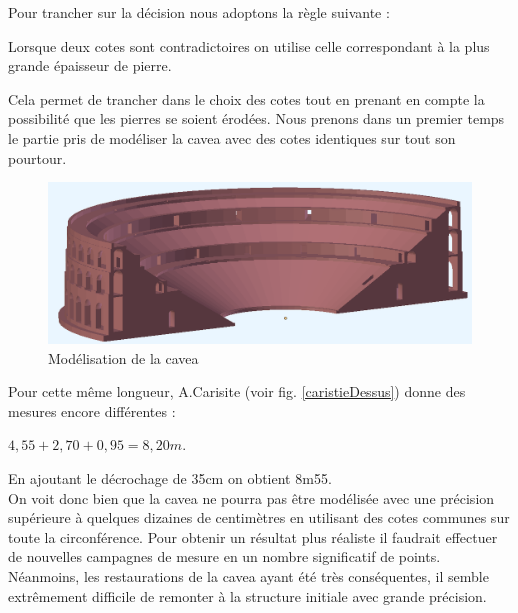 Pour trancher sur la décision nous adoptons la règle suivante :

\begin{theo}\label{epaisseur}
	Lorsque deux cotes sont contradictoires on utilise celle correspondant à la plus grande épaisseur de pierre.
\end{theo}

Cela permet de trancher dans le choix des cotes tout en prenant en compte la possibilité que les pierres se soient érodées. Nous prenons dans un premier temps le partie pris de modéliser la cavea avec des cotes identiques sur tout son pourtour. 

\begin{figure}[!h]
	\includegraphics[width=\linewidth]{images/modCavea}
	\caption{Modélisation de la \gls{cavea}} 
	\label{modCavea} 
\end{figure} 


Pour cette même longueur, A.Carisite (voir fig. \ref{caristieDessus}) donne des mesures encore différentes : 
\begin{center}
$4,55+2,70+0,95=8,20m$.
\end{center}
En ajoutant le décrochage de 35cm on obtient 8m55. \\

On voit donc bien que la cavea ne pourra pas être modélisée avec une précision supérieure à quelques dizaines de centimètres en utilisant des cotes communes sur toute la circonférence. Pour obtenir un résultat plus réaliste il faudrait effectuer de nouvelles campagnes de mesure en un nombre significatif de points. Néanmoins, les restaurations de la cavea ayant été très conséquentes, il semble extrêmement difficile de remonter à la structure initiale avec grande précision.

